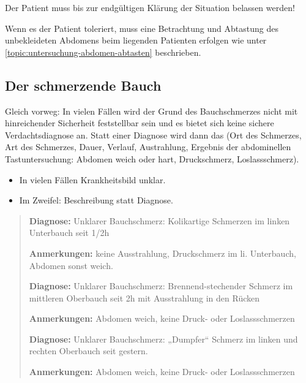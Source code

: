 Der Patient muss bis zur endgültigen Klärung der Situation
 belassen werden!

Wenn es der Patient toleriert, muss eine Betrachtung und
Abtastung des unbekleideten Abdomens beim liegenden
Patienten erfolgen wie unter
\ref{topic:untersuchung-abdomen-abtasten} beschrieben.

\subsection{Der schmerzende Bauch}

{
Gleich vorweg: In vielen
Fällen wird der Grund des Bauchschmerzes nicht mit
hinreichender Sicherheit feststellbar sein und es bietet sich
keine sichere Verdachtsdiagnose an. Statt einer Diagnose wird
dann das  (Ort des Schmerzes, Art des
Schmerzes, Dauer, Verlauf, Austrahlung, Ergebnis der
abdominellen Tastuntersuchung: Abdomen weich oder hart,
Druckschmerz, Loslassschmerz).
}{
\begin{itemize}
  \item In vielen Fällen Krankheitsbild unklar.
  \item Im Zweifel: Beschreibung statt Diagnose.
\end{itemize}
}{}{}{}

{
\begin{quote}
{\sffamily\bfseries Diagnose:} {\ttfamily Unklarer
Bauchschmerz: Kolikartige Schmerzen im linken Unterbauch seit 1/2h }

{\sffamily\bfseries Anmerkungen:} {\ttfamily keine Ausstrahlung, Druckschmerz im li. Unterbauch, Abdomen sonst  weich.}
\vspace{0.5em}

{\sffamily\bfseries Diagnose:} {\ttfamily Unklarer
Bauchschmerz: Brennend-stechender Schmerz im mittleren
Oberbauch seit 2h mit Ausstrahlung in den Rücken}

{\sffamily\bfseries Anmerkungen:} {\ttfamily Abdomen weich,
keine Druck- oder Loslassschmerzen}
\vspace{0.5em}

{\sffamily\bfseries Diagnose:} {\ttfamily Unklarer
Bauchschmerz: „Dumpfer“ Schmerz im linken und rechten
Oberbauch seit gestern. }

{\sffamily\bfseries Anmerkungen:} {\ttfamily Abdomen
weich, keine Druck- oder Loslassschmerzen}
\end{quote}
}{

}{}{}{}



